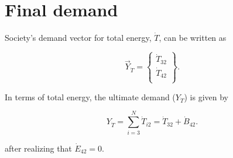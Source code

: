 %
%
%
%
%
%
%

\section{Final demand}

Society's demand vector for total energy, $\dot{T}$, can be written as 

\begin{equation} \label{eq:demand_vector_T_dot}
	\vec{Y}_{\dot{T}} = 	\begin{Bmatrix} 	\dot{T}_{32}	\\
																\dot{T}_{42}	\\
									\end{Bmatrix}.
\end{equation}

\noindent In terms of total energy, the ultimate demand ($Y_{\dot{T}}$) is given by 

\begin{equation} \label{eq:final_demand_T_sum}
	Y_{\dot{T}} = 	\sum_{i=3}^{N} \dot{T}_{i2} = \dot{T}_{32} + \dot{B}_{42}.
\end{equation}

\noindent after realizing that $\dot{E}_{42} = 0$. 

